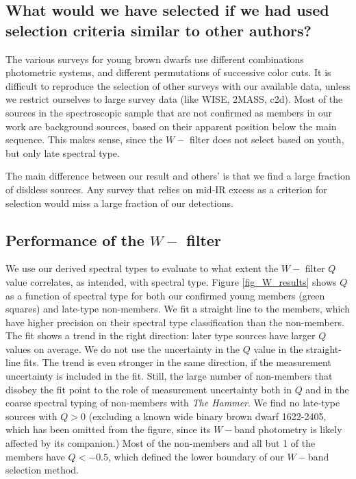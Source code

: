 \subsection{What would we have selected if we had used selection criteria similar to other authors?}
The various surveys for young brown dwarfs use different combinations photometric systems, and different permutations of successive color cuts.  It is difficult to reproduce the selection of other surveys with our available data, unless we restrict ourselves to large survey data (like WISE, 2MASS, c2d).  Most of the sources in the spectroscopic sample that are not confirmed as members in our work are background sources, based on their apparent position below the main sequence.  This makes sense, since the $W-$ filter does not select based on youth, but only late spectral type.  

The main difference between our result and others' is that we find a large fraction of diskless sources.  Any survey that relies on mid-IR excess as a criterion for selection would miss a large fraction of our detections.

\subsection{Performance of the $W-$ filter}

We use our derived spectral types to evaluate to what extent the $W-$ filter $Q$ value correlates, as intended, with spectral type.  Figure \ref{fig_W_results} shows $Q$ as a function of spectral type for both our confirmed young members (green squares) and late-type non-members.  We fit a straight line to the members, which have higher precision on their spectral type classification than the non-members.  The fit shows a trend in the right direction: later type sources have larger $Q$ values on average.  We do not use the uncertainty in the $Q$ value in the straight-line fits.  The trend is even stronger in the same direction, if the measurement uncertainty is included in the fit.  Still, the large number of non-members that disobey the fit point to the role of measurement uncertainty both in $Q$ and in the coarse spectral typing of non-members with \emph{The Hammer}.  We find no late-type sources with $Q>0$ (excluding a known wide binary brown dwarf 1622-2405, which has been omitted from the figure, since its $W-$band photometry is likely affected by its companion.)  Most of the non-members and all but 1 of the members have $Q<-0.5$, which defined the lower boundary of our $W-$band selection method.  

